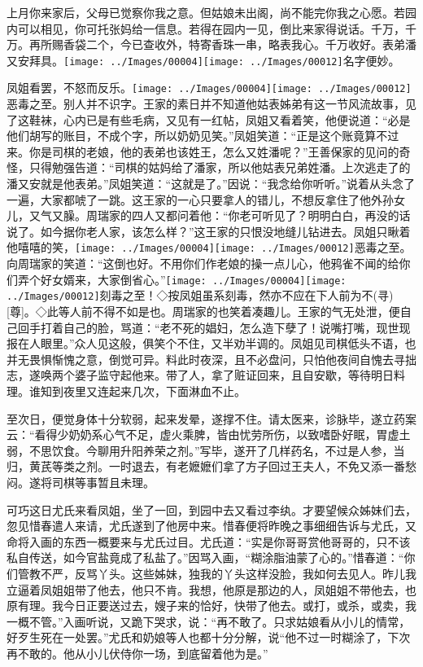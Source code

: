 上月你来家后，父母已觉察你我之意。但姑娘未出阁，尚不能完你我之心愿。若园内可以相见，你可托张妈给一信息。若得在园内一见，倒比来家得说话。千万，千万。再所赐香袋二个，今已查收外，特寄香珠一串，略表我心。千万收好。表弟潘又安拜具。{\texttt{[image: ../Images/00004]}\texttt{[image: ../Images/00012]}\footnotesize \kaishu 名字便妙。}

凤姐看罢，不怒而反乐。{\texttt{[image: ../Images/00004]}\texttt{[image: ../Images/00012]}\footnotesize \kaishu 恶毒之至。}别人并不识字。王家的素日并不知道他姑表姊弟有这一节风流故事，见了这鞋袜，心内已是有些毛病，又见有一红帖，凤姐又看着笑，他便说道：``必是他们胡写的账目，不成个字，所以奶奶见笑。''凤姐笑道：``正是这个账竟算不过来。你是司棋的老娘，他的表弟也该姓王，怎么又姓潘呢？''王善保家的见问的奇怪，只得勉强告道：``司棋的姑妈给了潘家，所以他姑表兄弟姓潘。上次逃走了的潘又安就是他表弟。''凤姐笑道：``这就是了。''因说：``我念给你听听。''说着从头念了一遍，大家都唬了一跳。这王家的一心只要拿人的错儿，不想反拿住了他外孙女儿，又气又臊。周瑞家的四人又都问着他：``你老可听见了？明明白白，再没的话说了。如今据你老人家，该怎么样？''这王家的只恨没地缝儿钻进去。凤姐只瞅着他嘻嘻的笑，{\texttt{[image: ../Images/00004]}\texttt{[image: ../Images/00012]}\footnotesize \kaishu 恶毒之至。}向周瑞家的笑道：``这倒也好。不用你们作老娘的操一点儿心，他鸦雀不闻的给你们弄个好女婿来，大家倒省心。''{\texttt{[image: ../Images/00004]}\texttt{[image: ../Images/00012]}\footnotesize \kaishu 刻毒之至！◇按凤姐虽系刻毒，然亦不应在下人前为不{(寻)}{[}尊{]}。◇此等人前不得不如是也。}周瑞家的也笑着凑趣儿。王家的气无处泄，便自己回手打着自己的脸，骂道：``老不死的娼妇，怎么造下孽了！说嘴打嘴，现世现报在人眼里。''众人见这般，俱笑个不住，又半劝半调的。凤姐见司棋低头不语，也并无畏惧惭愧之意，倒觉可异。料此时夜深，且不必盘问，只怕他夜间自愧去寻拙志，遂唤两个婆子监守起他来。带了人，拿了赃证回来，且自安歇，等待明日料理。谁知到夜里又连起来几次，下面淋血不止。

至次日，便觉身体十分软弱，起来发晕，遂撑不住。请太医来，诊脉毕，遂立药案云：``看得少奶奶系心气不足，虚火乘脾，皆由忧劳所伤，以致嗜卧好眠，胃虚土弱，不思饮食。今聊用升阳养荣之剂。''写毕，遂开了几样药名，不过是人参，当归，黄芪等类之剂。一时退去，有老嬷嬷们拿了方子回过王夫人，不免又添一番愁闷。遂将司棋等事暂且未理。

可巧这日尤氏来看凤姐，坐了一回，到园中去又看过李纨。才要望候众姊妹们去，忽见惜春遣人来请，尤氏遂到了他房中来。惜春便将昨晚之事细细告诉与尤氏，又命将入画的东西一概要来与尤氏过目。尤氏道：``实是你哥哥赏他哥哥的，只不该私自传送，如今官盐竟成了私盐了。''因骂入画，``糊涂脂油蒙了心的。''惜春道：``你们管教不严，反骂丫头。这些姊妹，独我的丫头这样没脸，我如何去见人。昨儿我立逼着凤姐姐带了他去，他只不肯。我想，他原是那边的人，凤姐姐不带他去，也原有理。我今日正要送过去，嫂子来的恰好，快带了他去。或打，或杀，或卖，我一概不管。''入画听说，又跪下哭求，说：``再不敢了。只求姑娘看从小儿的情常，好歹生死在一处罢。''尤氏和奶娘等人也都十分分解，说``他不过一时糊涂了，下次再不敢的。他从小儿伏侍你一场，到底留着他为是。''

